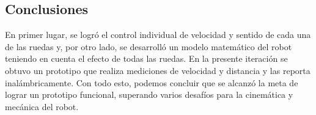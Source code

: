 \subsection{Conclusiones}

En primer lugar, se logró el control individual de velocidad y sentido de cada una de las ruedas y, por otro lado, se desarrolló un modelo matemático del robot teniendo en cuenta el efecto de todas las ruedas.
En la presente iteración se obtuvo un prototipo que realiza mediciones de velocidad y distancia y las reporta inalámbricamente. Con todo esto, podemos concluir que se alcanzó la meta de lograr un prototipo funcional, superando varios desafíos para la cinemática y mecánica del robot.